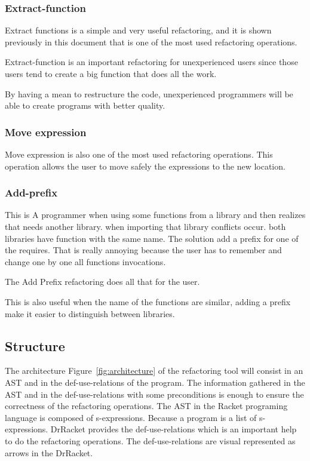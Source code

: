 \subsubsection{Extract-function}

Extract functions is a simple and very useful refactoring, and it is shown previously in this document that is one of the most used refactoring operations.

Extract-function is an important refactoring for unexperienced users since those users tend to create a big function that does all the work.

By having a mean to restructure the code, unexperienced programmers will be able to create programs with better quality.




\subsubsection{Move expression}

Move expression is also one of the most used refactoring operations.
This operation allows the user to move safely the expressions to the new location.



\subsubsection{Add-prefix}
This is 
A programmer when using some functions from a library and then realizes that needs another library. when importing that library conflicts occur.
both libraries have function with the same name. The solution add a prefix for one of the requires.
That is really annoying because the user has to remember and change one by one all functions invocations.

The Add Prefix refactoring does all that for the user.

This is also useful when the name of the functions are similar, adding a prefix make it easier to distinguish between libraries.





\subsection{Structure}

The architecture Figure~\ref{fig:architecture} of the refactoring tool will consist in an AST and in the def-use-relations of the program.
The information gathered in the AST and in the def-use-relations with some preconditions is enough to ensure the correctness of the refactoring operations.
The AST in the Racket programing language is composed of s-expressions. Because a program is a list of s-expressions.
DrRacket provides the def-use-relations which is an important help to do the refactoring operations. The def-use-relations are visual represented as arrows in the DrRacket.


